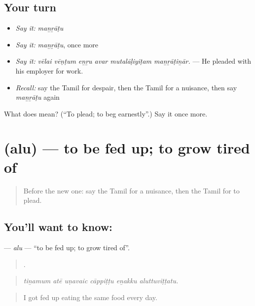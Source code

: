 \subsection*{Your turn}
\begin{itemize}
\raggedright
  \item \emph{Say it:} \emph{maṉṟāṭu}
  \item \emph{Say it:} \emph{maṉṟāṭu}, once more
  \item \emph{Say it:} \emph{vēlai vēṇṭum eṉṟu avar mutalāḷiyiṭam maṉṟāṭiṉār.} — He pleaded with his employer for work.
  \item \emph{Recall:} say the Tamil for despair, then the Tamil for a nuisance, then say \emph{maṉṟāṭu} again
\end{itemize}

\begin{tcolorbox}[breakable,colback=teal!4,colframe=teal!35!black,title={Before you move on}]
What does  mean? (\textquotedblleft{}To plead; to beg earnestly\textquotedblright{}.) Say it once more.
\end{tcolorbox}
\section[\texorpdfstring{\ta{அலு} (alu)}{அலு (alu)}]{ (alu) — to be fed up; to grow tired of}

\label{lesson:TA-C464-alu}



\begin{quote}
Before the new one: say the Tamil for a nuisance, then the Tamil for to plead.
\end{quote}

\subsection*{You'll want to know: }
\textbf{} — \emph{alu} — \textquotedblleft{}to be fed up; to grow tired of\textquotedblright{}.

\begin{quote}
     .
\end{quote}

\begin{quote}
\emph{tiṉamum atē uṇavaic cāppiṭṭu eṉakku aluttuviṭṭatu.}
\end{quote}

\begin{quote}
I got fed up eating the same food every day.
\end{quote}

